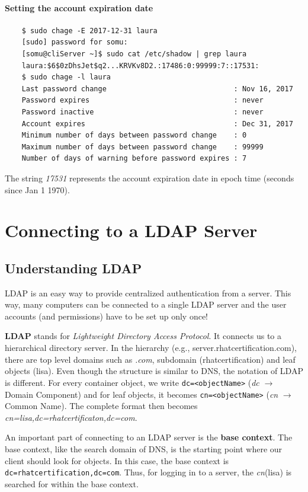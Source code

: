 \documentclass{report}
\begin{document}
	\subsubsection{Setting the account expiration date}
	\vspace{-10pt}
	\begin{verbatim}
	$ sudo chage -E 2017-12-31 laura
	[sudo] password for somu: 
	[somu@cliServer ~]$ sudo cat /etc/shadow | grep laura
	laura:$6$0zDhsJet$q2...KRVKv8D2.:17486:0:99999:7::17531:
	$ sudo chage -l laura
	Last password change                              : Nov 16, 2017
	Password expires                                  : never
	Password inactive                                 : never
	Account expires                                   : Dec 31, 2017
	Minimum number of days between password change    : 0
	Maximum number of days between password change    : 99999
	Number of days of warning before password expires : 7
	\end{verbatim}
	The string \textit{17531} represents the account expiration date in epoch time (seconds since Jan 1 1970).
	
	\chapter{Connecting to a LDAP Server}
	\section{Understanding LDAP}
	LDAP is an easy way to provide centralized authentication from a server. This way, many computers can be connected to a single LDAP server and the user accounts (and permissions) have to be set up only once!
	
	\textbf{LDAP} stands for \textit{Lightweight Directory Access Protocol}. It connects us to a hierarchical directory server. In the hierarchy (e.g., server.rhatcertification.com), there are top level domains such as \textit{.com}, subdomain (rhatcertification) and leaf objects (lisa). Even though the structure is similar to DNS, the notation of LDAP is different. For every container object, we write \verb|dc=<objectName>| (\textit{dc} $\rightarrow$ Domain Component) and for leaf objects, it becomes \verb|cn=<objectName>| (\textit{cn} $\rightarrow$ Common Name). The complete format then becomes \textit{cn=lisa,dc=rhatcertificaton,dc=com}.
	
	An important part of connecting to an LDAP server is the \textbf{base context}. The base context, like the search domain of DNS, is the starting point where our client should look for objects. In this case, the base context is \verb|dc=rhatcertification,dc=com|. Thus, for logging in to a server, the \textit{cn}(lisa) is searched for within the base context. 
	
\end{document}
